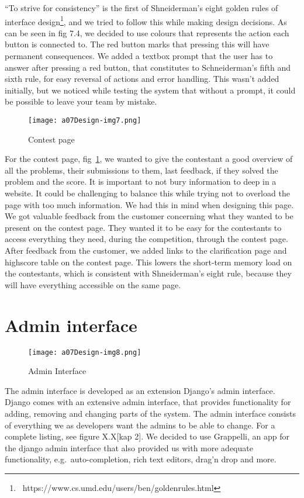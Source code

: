 ``To strive for consistency'' is the
first of Shneiderman's eight golden rules of interface
design\footnote{\ https://www.cs.umd.edu/users/ben/goldenrules.html},
and we tried to follow this while making design decisions. As can be
seen in fig 7.4, we decided to use colours that represents the action
each button is connected to. The red button marks that pressing this
will have permanent consequences. We added a textbox prompt that the
user has to answer after pressing a red button, that constitutes to
Schneiderman's fifth and sixth rule, for easy reversal
of actions and error handling. This wasn't added
initially, but we noticed while testing the system that without a
prompt, it could be possible to leave your team by mistake.
 \begin{figure}[h!]
	\texttt{[image: a07Design-img7.png]} 
	\caption{Contest page}
	\label{fig:contestPage}
\end{figure}

For the contest page, fig~\ref{fig:contestPage}, we wanted to give the contestant a good
overview of all the problems, their submissions to them, last feedback,
if they solved the problem and the score. It is important to not bury
information to deep in a website. It could be challenging to balance
this while trying not to overload the page with too much information.
We had this in mind when designing this page. We got valuable feedback
from the customer concerning what they wanted to be present on the
contest page. They wanted it to be easy for the contestants to access
everything they need, during the competition, through the contest page.
After feedback from the customer, we added links to the clarification
page and highscore table on the contest page. This lowers the
short-term memory load on the contestants, which is consistent with
Shneiderman's eight rule, because they will have
everything accessible on the same page.


\section{Admin interface}

 \begin{figure}[h!]
	\texttt{[image: a07Design-img8.png]} 
	\caption{Admin Interface}
	\label{fig:adminInterface}
\end{figure}

The admin interface is developed as an extension
Django's admin interface. Django comes with an
extensive admin interface, that provides functionality for adding,
removing and changing parts of the system. The admin interface consists
of everything we as developers want the admins to be able to change.
For a complete listing, see figure X.X[kap 2]. We decided to use
Grappelli, an app for the django admin interface that also provided us
with more adequate functionality, e.g.\ auto-completion, rich text
editors, drag'n drop and more.

